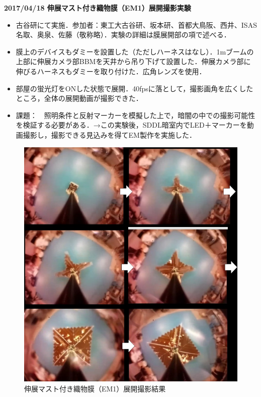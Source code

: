 \noindent \textbf{2017/04/18 伸展マスト付き織物膜（EM1）展開撮影実験}
\begin{itemize}
	\item 古谷研にて実施．参加者：東工大古谷研、坂本研、首都大鳥阪、西井、ISAS名取、奥泉、佐藤（敬称略）．実験の詳細は膜展開部の項で述べる．
	\item 膜上のデバイスもダミーを設置した（ただしハーネスはなし）．1mブームの上部に伸展カメラ部BBMを天井から吊り下げて設置した．伸展カメラ部に伸びるハーネスもダミーを取り付けた．広角レンズを使用．
	\item 部屋の蛍光灯をONした状態で展開．40fpsに落として，撮影画角を広くしたところ，全体の展開動画が撮影できた．
	\item 課題：　照明条件と反射マーカーを模擬した上で，暗闇の中での撮影可能性を検証する必要がある．→この実験後，SDDL暗室内でLED＋マーカーを動画撮影し，撮影できる見込みを得てEM製作を実施した．
\end{itemize}
\begin{figure}[H]
	\centering
	\includegraphics[width=.8\textwidth]{03/fig/3-9-2-3-6.jpg}
	\caption{伸展マスト付き織物膜（EM1）展開撮影結果}
	\label{fig3-9-2-3-6}
\end{figure}

